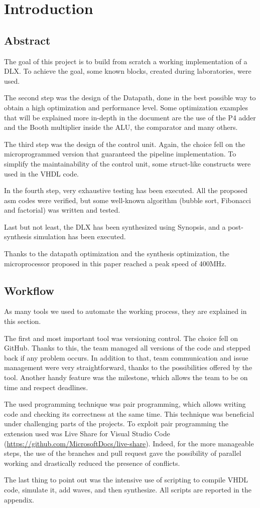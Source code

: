 \chapter{Introduction}

\section{Abstract}
The goal of this project is to build from scratch a working implementation of a DLX. To achieve the goal, some known blocks, created during laboratories, were used. 

The second step was the design of the Datapath, done in the best possible way to obtain a high optimization and performance level. Some optimization examples that will be explained more in-depth in the document are the use of the P4 adder and the Booth multiplier inside the ALU, the comparator and many others. 

The third step was the design of the control unit. Again, the choice fell on the microprogrammed version that guaranteed the pipeline implementation. To simplify the maintainability of the control unit, some struct-like constructs were used in the VHDL code. 

In the fourth step, very exhaustive testing has been executed. All the proposed asm codes were verified, but some well-known algorithm (bubble sort, Fibonacci and factorial) was written and tested.

Last but not least, the DLX has been synthesized using Synopsis, and a post-synthesis simulation has been executed. 

Thanks to the datapath optimization and the synthesis optimization, the microprocessor proposed in this paper reached a peak speed of 400MHz.  
\section{Workflow}
As many tools we used to automate the working process, they are explained in this section.

The first and most important tool was versioning control. The choice fell on GitHub. Thanks to this, the team managed all versions of the code and stepped back if any problem occurs. In addition to that, team communication and issue management were very straightforward, thanks to the possibilities offered by the tool. Another handy feature was the milestone, which allows the team to be on time and respect deadlines. 

The used programming technique was pair programming, which allows writing code and checking its correctness at the same time. This technique was beneficial under challenging parts of the projects. To exploit pair programming the extension used was Live Share for Visual Studio Code (\url{https://github.com/MicrosoftDocs/live-share}). Indeed, for the more manageable steps, the use of the branches and pull request gave the possibility of parallel working and drastically reduced the presence of conflicts. 

The last thing to point out was the intensive use of scripting to compile VHDL code, simulate it, add waves, and then synthesize. All scripts are reported in the appendix.